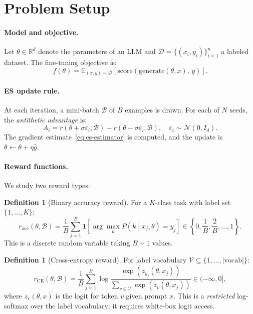 \documentclass[11pt]{article}
\theoremstyle{definition}
\newtheorem{definition}[theorem]{Definition}
\theoremstyle{remark}
\newcommand{\E}{\mathbb{E}}
\newcommand{\R}{\mathbb{R}}
\begin{document}
\section{Problem Setup}
\label{sec:setup}

\paragraph{Model and objective.}
Let $\theta \in \R^d$ denote the parameters of an LLM and $\mathcal{D} = \{(x_i, y_i)\}_{i=1}^{n}$ a labeled dataset. The fine-tuning objective is:
\begin{equation}
  f(\theta) = \E_{(x,y) \sim \mathcal{D}}\left[\mathrm{score}(\mathrm{generate}(\theta, x),\, y)\right].
\end{equation}

\paragraph{ES update rule.}
At each iteration, a mini-batch $\mathcal{B}$ of $B$ examples is drawn. For each of $N$ seeds, the \emph{antithetic advantage} is:
\begin{equation}
  A_i = r(\theta + \sigma\varepsilon_i, \mathcal{B}) - r(\theta - \sigma\varepsilon_i, \mathcal{B}),
  \quad \varepsilon_i \sim \mathcal{N}(0, I_d).
  \label{eq:advantage}
\end{equation}
The gradient estimate~\eqref{eq:es-estimator} is computed, and the update is $\theta \leftarrow \theta + \eta \hat{g}$.

\paragraph{Reward functions.}
We study two reward types:

\begin{definition}[Binary accuracy reward]
For a $K$-class task with label set $\{1,\ldots,K\}$:
\begin{equation}
  r_{\mathrm{acc}}(\theta, \mathcal{B}) = \frac{1}{B}\sum_{j=1}^{B} \mathbf{1}\!\left[\arg\max_k P(k \mid x_j, \theta) = y_j\right] \in \left\{0, \frac{1}{B}, \frac{2}{B}, \ldots, 1\right\}.
  \label{eq:binary-reward}
\end{equation}
This is a discrete random variable taking $B+1$ values.
\end{definition}

\begin{definition}[Cross-entropy reward]
For label vocabulary $\mathcal{V} \subseteq \{1,\ldots,|\mathrm{vocab}|\}$:
\begin{equation}
  r_{\mathrm{CE}}(\theta, \mathcal{B}) = \frac{1}{B}\sum_{j=1}^{B} \log \frac{\exp(z_{y_j}(\theta, x_j))}{\sum_{v \in \mathcal{V}} \exp(z_v(\theta, x_j))} \in (-\infty, 0],
  \label{eq:ce-reward}
\end{equation}
where $z_v(\theta, x)$ is the logit for token $v$ given prompt $x$. This is a \emph{restricted} log-softmax over the label vocabulary; it requires white-box logit access.
\end{definition}
\end{document}
